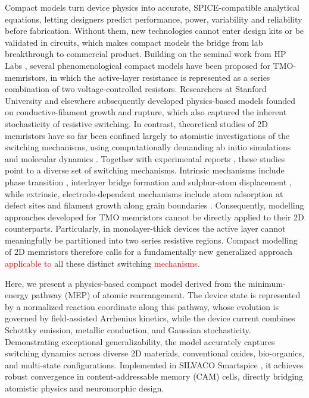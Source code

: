 \documentclass[aip,apl,reprint,floatfix]{revtex4-2}
\newcommand{\changed}[1]{\textcolor{red}{#1}}
\begin{document}
Compact models turn device physics into accurate, SPICE-compatible analytical equations, letting designers predict performance, power, variability and reliability before fabrication. Without them, new technologies cannot enter design kits or be validated in circuits, which makes compact models the bridge from lab breakthrough to commercial product. Building on the seminal work from HP Labs \cite{Strukov2008}, several phenomenological compact models \cite{Pickett2009Switching,Kvatinsky2013TEAM} have been proposed for TMO-memristors, in which the active-layer resistance is represented as a series combination of two voltage-controlled resistors. Researchers at Stanford University \cite{Jiang} and elsewhere \cite{Yu,Guan2012,Huang2013,Li2014} subsequently developed physics-based models founded on conductive-filament growth and rupture, which also captured the inherent stochasticity of resistive switching. In contrast, theoretical studies of 2D memristors have so far been confined largely to atomistic investigations of the switching mechanisms, using computationally demanding ab initio simulations and molecular dynamics \cite{Mitra2024Atomistic}. Together with experimental reports \cite{atomrister,zhang2019electric}, these studies point to a diverse set of switching mechanisms. Intrinsic mechanisms include phase transition \cite{zhang2019electric}, interlayer bridge formation \cite{Ducry2022} and sulphur-atom displacement \cite{Mitra2021}, while extrinsic, electrode-dependent mechanisms include atom adsorption at defect sites \cite{Hus2021,Ge2018} and filament growth along grain boundaries \cite{Sangwan2015}. Consequently, modelling approaches developed for TMO memristors cannot be directly applied to their 2D counterparts. Particularly, in monolayer-thick devices \cite{Rajput2024DefectEngineered} the active layer cannot meaningfully be partitioned into two series resistive regions. Compact modelling of 2D memristors therefore calls for a fundamentally new generalized approach \changed{applicable to} all these distinct switching \changed{mechanisms}. 

Here, we present a physics-based compact model derived from the minimum-energy pathway (MEP) of atomic rearrangement. The device state is represented by a normalized reaction coordinate along this pathway, whose evolution is governed by field-assisted Arrhenius kinetics, while the device current combines Schottky emission, metallic conduction, and Gaussian stochasticity. Demonstrating exceptional generalizability, the model accurately captures switching dynamics across diverse 2D materials, conventional oxides, bio-organics, and multi-state configurations. Implemented in SILVACO Smartspice \cite{SilvacoSmartSpice}, it achieves robust convergence in content-addressable memory (CAM) cells, directly bridging atomistic physics and neuromorphic design.
\end{document}
